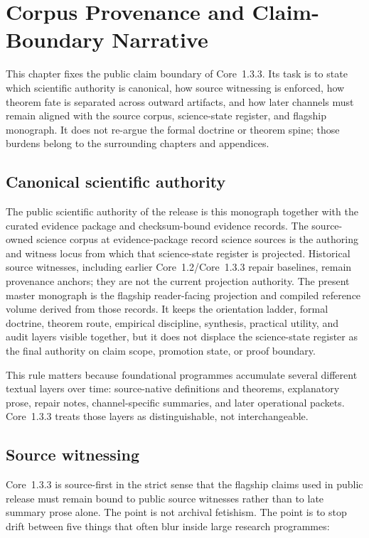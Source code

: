\section{Corpus Provenance and Claim-Boundary Narrative}
\label{sec:oc13-publication-boundary}

This chapter fixes the public claim boundary of Core~1.3.3. Its task is to state
which scientific authority is canonical, how source witnessing is enforced, how
theorem fate is separated across outward artifacts, and how later channels must
remain aligned with the source corpus, science-state register, and flagship monograph. It does not re-argue the formal doctrine or
theorem spine; those burdens belong to the surrounding chapters and appendices.

\subsection{Canonical scientific authority}

The public scientific authority of the release is this monograph together with the curated evidence package and checksum-bound evidence records. The source-owned science corpus at
evidence-package record science sources is the
authoring and witness locus from which that science-state register is projected. Historical
source witnesses, including earlier Core~1.2/Core~1.3.3 repair baselines, remain
provenance anchors; they are not the current projection authority. The present
master monograph is the flagship reader-facing projection and compiled
reference volume derived from those records. It keeps the orientation ladder,
formal doctrine, theorem route, empirical discipline, synthesis, practical
utility, and audit layers visible together, but it does not displace the science-state register
as the final authority on claim scope, promotion state, or proof boundary.

This rule matters because foundational programmes accumulate several different
textual layers over time: source-native definitions and theorems, explanatory
prose, repair notes, channel-specific summaries, and later operational packets.
Core~1.3.3 treats those layers as distinguishable, not interchangeable.

\subsection{Source witnessing}

Core~1.3.3 is source-first in the strict sense that the flagship claims used in
public release must remain bound to public source witnesses rather than to late
summary prose alone. The point is not archival fetishism. The point is to stop
drift between five things that often blur inside large research programmes:

